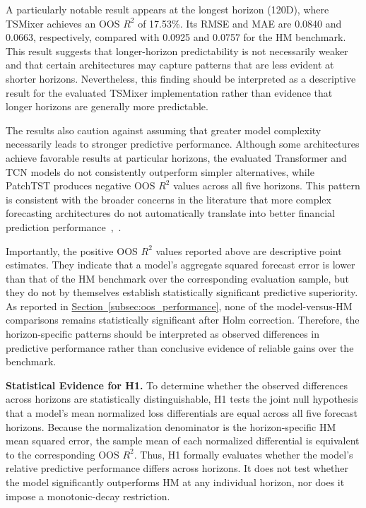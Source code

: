 \documentclass[12pt,twoside]{ord}
\begin{document}
A particularly notable result appears at the longest horizon (120D), where TSMixer achieves an OOS $R^2$ of 17.53\%. Its RMSE and MAE are 0.0840 and 0.0663, respectively, compared with 0.0925 and 0.0757 for the HM benchmark. This result suggests that longer-horizon predictability is not necessarily weaker and that certain architectures may capture patterns that are less evident at shorter horizons. Nevertheless, this finding should be interpreted as a descriptive result for the evaluated TSMixer implementation rather than evidence that longer horizons are generally more predictable.

The results also caution against assuming that greater model complexity necessarily leads to stronger predictive performance. Although some architectures achieve favorable results at particular horizons, the evaluated Transformer and TCN models do not consistently outperform simpler alternatives, while PatchTST produces negative OOS $R^2$ values across all five horizons. This pattern is consistent with the broader concerns in the literature that more complex forecasting architectures do not automatically translate into better financial prediction performance~\cite{welch2008},~\cite{gu2020}.

Importantly, the positive OOS $R^2$ values reported above are descriptive point estimates. They indicate that a model's aggregate squared forecast error is lower than that of the HM benchmark over the corresponding evaluation sample, but they do not by themselves establish statistically significant predictive superiority. As reported in \hyperref[subsec:oos_performance]{Section~\ref*{subsec:oos_performance}}, none of the model-versus-HM comparisons remains statistically significant after Holm correction. Therefore, the horizon-specific patterns should be interpreted as observed differences in predictive performance rather than conclusive evidence of reliable gains over the benchmark.

\medskip
\noindent\textbf{Statistical Evidence for H1.} To determine whether the observed differences across horizons are statistically distinguishable, H1 tests the joint null hypothesis that a model's mean normalized loss differentials are equal across all five forecast horizons. Because the normalization denominator is the horizon-specific HM mean squared error, the sample mean of each normalized differential is equivalent to the corresponding OOS $R^2$. Thus, H1 formally evaluates whether the model's relative predictive performance differs across horizons. It does not test whether the model significantly outperforms HM at any individual horizon, nor does it impose a monotonic-decay restriction.
\end{document}
